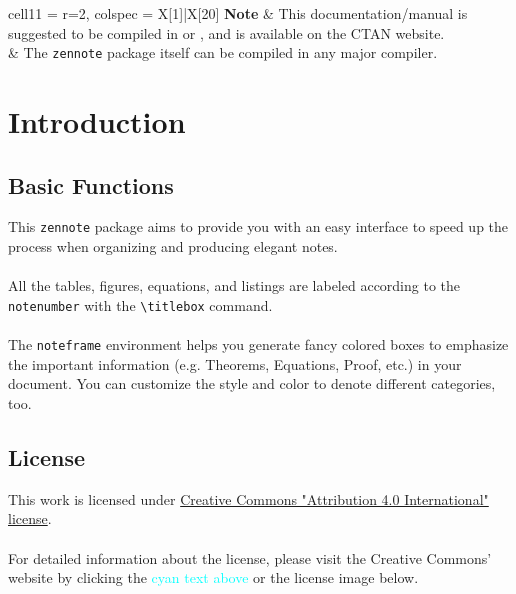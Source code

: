 \documentclass{article}
\begin{document}


\begin{tblr}{
cell{1}{1} = {r=2}{},
colspec = {X[1]|X[20]}
}
\textbf{Note} & This documentation/manual is suggested to be compiled in {\textcm {}} or {\textcm {}}, and is available on the CTAN website. \\
  & The {\tt zennote} package itself can be compiled in any major {\textcm {}} compiler.
\end{tblr}


\thispagestyle{empty}
\tableofcontents

\newpage
\setcounter{page}{1}

\section{Introduction}
\subsection{Basic Functions}
This {\tt zennote} package aims to provide you with an easy interface to speed up the process when organizing and producing elegant notes.\\
\\
All the tables, figures, equations, and listings are labeled according to the {\tt notenumber} with the \verb+\titlebox+ command.\\
\\
The {\tt noteframe} environment helps you generate fancy colored boxes to emphasize the important information (e.g. Theorems, Equations, Proof, etc.) in your document. You can customize the style and color to denote different categories, too.

\subsection{License}
This work is licensed under \href{https://creativecommons.org/licenses/by/4.0/}{Creative Commons "Attribution 4.0 International" license}.\\
\\
For detailed information about the license, please visit the Creative Commons' website by clicking the \textcolor{Cyan}{cyan text above} or the license image below.
\\
\begin{flushright}
    \doclicenseImage
\end{flushright}
\end{document}
